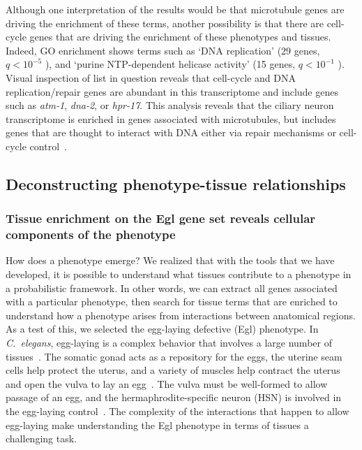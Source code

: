 \documentclass[10pt,letterpaper,twocolumn]{article}
\newcommand{\cel}{\emph{C.~elegans}}
\newcommand{\qval}[1]{
                      \ensuremath{
                                  q<10^{-#1}
                                  }
                      }
\begin{document}
Although one interpretation of the results would be that microtubule genes
are driving the enrichment of these terms, another possibility is that
there are cell-cycle genes that are driving the enrichment of these phenotypes
and tissues. Indeed, GO enrichment shows terms such as `DNA replication' (29
genes, \qval{5}), and `purine NTP-dependent helicase activity'
(15 genes, \qval{1}). Visual inspection of list in question reveals that
cell-cycle and DNA replication/repair genes are abundant in this transcriptome
and include genes such as \emph{atm-1}, \emph{dna-2}, or \emph{hpr-17}. This
analysis reveals that the ciliary neuron transcriptome is enriched in
genes associated with microtubules, but includes genes that are thought to
interact with DNA either via repair mechanisms or cell-cycle
control~\cite{Hofmann2000,Lee2003a,Bailly2010}.

\subsection*{Deconstructing phenotype-tissue relationships}
\subsubsection*{Tissue enrichment on the Egl gene set reveals cellular
components of the phenotype}
How does a phenotype emerge? We realized that with the tools that we have
developed, it is possible to understand what tissues contribute to a phenotype
in a probabilistic framework. In other words, we can extract all genes associated
with a particular phenotype, then search for tissue terms that are enriched to
understand how a phenotype arises from interactions between anatomical regions.
As a test of this, we selected the egg-laying defective (Egl) phenotype.
In \cel{}, egg-laying is a complex behavior that involves
a large number of tissues~\cite{Li1990}. The somatic gonad acts as a
repository for the eggs,
the uterine seam cells help protect the uterus, and a variety of muscles help
contract the uterus and open the vulva to lay an egg~\cite{Sulston1977}. The
vulva must be well-formed
to allow passage of an egg, and the hermaphrodite-specific neuron (HSN) is involved
in the egg-laying control~\cite{Schafer2005}. The complexity of the interactions that
happen to allow egg-laying make understanding the Egl phenotype in terms of
tissues a challenging task.
\end{document}
